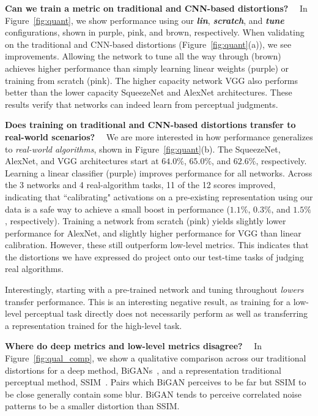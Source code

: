   \textbf{Can we train a metric on traditional and CNN-based distortions?} \ \  In Figure~\ref{fig:quant}, we show performance using our \textbf{\textit{lin}}, \textbf{\textit{scratch}}, and \textbf{\textit{tune}} configurations, shown in purple, pink, and brown, respectively. When validating on the traditional and CNN-based distortions (Figure~\ref{fig:quant}(a)), we see improvements. Allowing the network to tune all the way through (brown) achieves higher performance than simply learning linear weights (purple) or training from scratch (pink). The higher capacity network VGG also performs better than the lower capacity SqueezeNet and AlexNet architectures. These results verify that networks can indeed learn from perceptual judgments.

  \textbf{Does training on traditional and CNN-based distortions transfer to real-world scenarios?} \ \  We are more interested in how performance generalizes to \textit{real-world algorithms}, shown in Figure~\ref{fig:quant}(b). The SqueezeNet, AlexNet, and VGG architectures start at $64.0\%$, $65.0\%$, and $62.6\%$, respectively. Learning a linear classifier (purple) improves performance for all networks. Across the 3 networks and 4 real-algorithm tasks, 11 of the 12 scores improved, indicating that ``calibrating" activations on a pre-existing representation using our data is a safe way to achieve a small boost in performance ($1.1\%$, $0.3\%$, and $1.5\%$, respectively). Training a network from scratch (pink) yields slightly lower performance for AlexNet, and slightly higher performance for VGG than linear calibration. However, these still outperform low-level metrics. This indicates that the distortions we have expressed do project onto our test-time tasks of judging real algorithms. 

Interestingly, starting with a pre-trained network and tuning throughout \textit{lowers} transfer performance. This is an interesting negative result, as training for a low-level perceptual task directly does not necessarily perform as well as transferring a representation trained for the high-level task.

  \textbf{Where do deep metrics and low-level metrics disagree?} \ \  In Figure~\ref{fig:qual_comp}, we show a qualitative comparison across our traditional distortions for a deep method, BiGANs~\cite{donahue2016adversarial}, and a representation traditional perceptual method, SSIM~\cite{wang2004image}. Pairs which BiGAN perceives to be far but SSIM to be close generally contain some blur. BiGAN tends to perceive correlated noise patterns to be a smaller distortion than SSIM.

